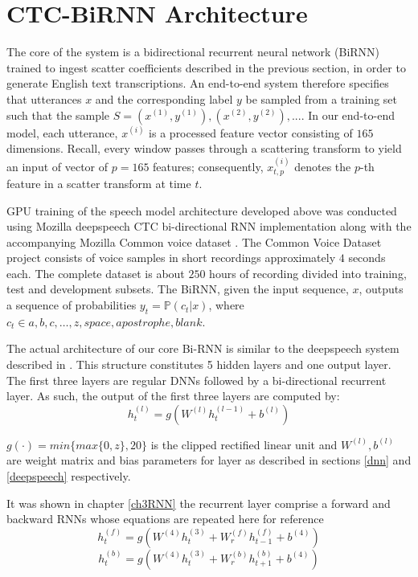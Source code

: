 \section{CTC-BiRNN Architecture}
The core of the system is a bidirectional recurrent neural network (BiRNN) trained to ingest scatter coefficients described in the previous section, in order to generate English text transcriptions.  An end-to-end system therefore specifies that utterances $x$ and the corresponding label $y$ be sampled from a training set such that the sample $S = {(x^{(1)}, y^{(1)}), (x^{(2)}, y^{(2)}), . . .}$.   In our end-to-end model, each utterance, $x^{(i)}$ is a processed feature vector consisting of $165$ dimensions.  Recall, every window passes through a scattering transform to yield an input of vector of $p=165$ features; consequently,   $x^{(i)}_{t,p}$ denotes the $p$-th feature in a scatter transform at time $t$.  

GPU training of the speech model architecture developed above was conducted using Mozilla deepspeech \citep{mozilla/deepspeech_2019} CTC bi-directional RNN implementation along with the accompanying Mozilla Common voice dataset  \citep{mozilla_2019}.  The Common Voice Dataset project consists of voice samples in short recordings approximately $4$ seconds each.  The complete dataset is about $250$ hours of recording divided into training, test and development subsets.  The BiRNN, given the input sequence, $x$, outputs a sequence of probabilities $y_t=\mathbb{P}(c_t|x)$,  where $c_t \in a,b,c,\dots,z,space,apostrophe,blank$. 

The actual architecture of our core Bi-RNN is similar to the deepspeech system described in \cite{hannun2014deep}. This structure constitutes 5 hidden layers and one output layer.  The first three layers are regular DNNs followed by a bi-directional recurrent layer. As such, the output of the first three layers are computed by:
\begin{equation}
    h^{(l)}_t = g(W^{(l)} h^{(l−1)}_t + b^{(l)})\label{ch06_01_l1-3}
\end{equation}

$g(\cdot) = min\{max\{0,z\},20\}$  is the clipped rectified linear unit and $W^{(l)},b^{(l)}$ are weight matrix and bias parameters for layer  as described in sections \ref{dnn} and \ref{deepspeech} respectively.

It was shown in chapter \ref{ch3RNN} the recurrent layer comprise a forward and backward RNNs whose equations are repeated here for reference
\begin{equation}
    h^{(f)}_t = g(W^{(4)} h^{(3)}_t + W^{(f)}_r h^{(f)}_{t−1} + b^{(4)})
    \label{ch06_02_fwd}
\end{equation}
\begin{equation}
h^{(b)}_t = g(W^{(4)} h^{(3)}_t + W^{(b)}_r h^{(b)}_{t+1} + b^{(4)})    \label{ch06_03_bwd}
\end{equation}

